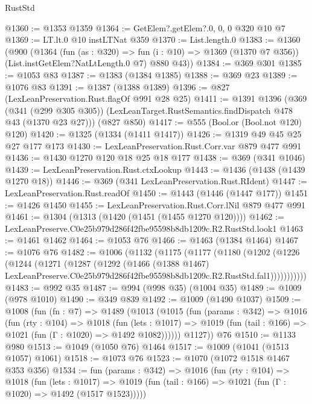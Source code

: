 \begin{lexlean}{RustStd}
\begin{coremodule}
@1360 := @1353 @1359
@1364 := GetElem?.getElem?.{0, 0, 0} @320 @10 @7
@1369 := LT.lt.{0} @10 instLTNat @359
@1370 := List.length.{0}
@1383 := @1360
    (@900
      (@1364
        (fun (as : @320) => fun (i : @10) => @1369 (@1370 @7 @356))
        (List.instGetElem?NatLtLength.{0} @7)
        @880
        @43))
@1384 := @369 @301
@1385 := @1053 @83
@1387 := @1383 (@1384 @1385)
@1388 := @369 @23
@1389 := @1076 @83
@1391 := @1387 (@1388 @1389)
@1396 := @827 (LexLeanPreservation.Rust.flagOf @991 @28 @25)
@1411 := @1391
    @1396
    (@369
      (@341 (@299 @305 @305))
      (LexLeanTarget.RustSemantics.findDispatch @478 @43 (@1370 @23 @27)))
    (@827 @850)
@1417 := @555 (Bool.or (Bool.not @120) @120)
@1420 := @1325 (@1334 (@1411 @1417))
@1426 := @1319 @49 @45 @25 @27 @177 @173
@1430 := LexLeanPreservation.Rust.Corr.var @879 @477 @991
@1436 := @1430 @1270 @120 @18 @25 @18 @177
@1438 := @369 (@341 @1046)
@1439 := LexLeanPreservation.Rust.ctxLookup
@1443 := @1436 (@1438 (@1439 @1270 @18))
@1446 := @369 (@341 LexLeanPreservation.Rust.RIdent)
@1447 := LexLeanPreservation.Rust.readOf
@1450 := @1443 (@1446 (@1447 @177))
@1451 := @1426 @1450
@1455 := LexLeanPreservation.Rust.Corr.lNil @879 @477 @991
@1461 := @1304 (@1313 (@1420 (@1451 (@1455 @1270 @120))))
@1462 := LexLeanPreserve.C0e25b979d286f42fbe95598b8db1209c.R2.RustStd.look1
@1463 := @1461 @1462
@1464 := @1053 @76
@1466 := @1463 (@1384 @1464)
@1467 := @1076 @76
@1482 := @1006
    (@1132
      (@1175
        (@1177
          (@1180
            (@1202
              (@1226
                (@1244
                  (@1271
                    (@1287
                      (@1292
                        (@1466
                          (@1388 @1467)
                          LexLeanPreserve.C0e25b979d286f42fbe95598b8db1209c.R2.RustStd.fal1)))))))))))
@1483 := @992 @35
@1487 := @994 (@998 @35) (@1004 @35)
@1489 := @1009 (@978 @1010)
@1490 := @349 @839
@1492 := @1009 (@1490 @1037)
@1509 := @1008
    (fun (fn : @7) =>
    @1489
      (@1013
        (@1015
          (fun (params : @342) =>
          @1016
            (fun (rty : @104) =>
            @1018
              (fun (lets : @1017) =>
              @1019 (fun (tail : @166) => @1021 (fun (Γ : @1020) => @1492 @1082))))))
        @1127))
    @76
@1510 := @1133 @980
@1513 := @1049 (@1050 @76) @1464
@1517 := @1009 (@1041 (@1513 @1057) @1061)
@1518 := @1073 @76
@1523 := @1070 (@1072 @1518 @1467 @353 @356)
@1534 := fun (params : @342) =>
  @1016
    (fun (rty : @104) =>
    @1018
      (fun (lets : @1017) =>
      @1019 (fun (tail : @166) => @1021 (fun (Γ : @1020) => @1492 (@1517 @1523)))))

\end{coremodule}
\end{lexlean}
